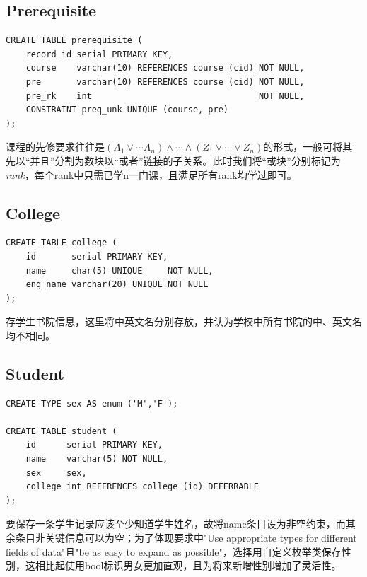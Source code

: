 \subsection{Prerequisite}
\begin{lstlisting}
CREATE TABLE prerequisite (
    record_id serial PRIMARY KEY,
    course    varchar(10) REFERENCES course (cid) NOT NULL,
    pre       varchar(10) REFERENCES course (cid) NOT NULL,
    pre_rk    int                                 NOT NULL,
    CONSTRAINT preq_unk UNIQUE (course, pre)
);
\end{lstlisting}
\vspace{-3em}\par
课程的先修要求往往是$(A_1\lor \cdots A_n)\land \cdots \land (Z_1\lor\cdots\lor Z_n)$的形式，一般可将其先以“并且”分割为数块以“或者”链接的子关系。此时我们将“或块”分别标记为\emph{rank}，每个rank中只需已学n一门课，且满足所有rank均学过即可。

\subsection{College}
\begin{lstlisting}
CREATE TABLE college (
    id       serial PRIMARY KEY,
    name     char(5) UNIQUE     NOT NULL,
    eng_name varchar(20) UNIQUE NOT NULL
);
\end{lstlisting}
\vspace{-3em}\par
存学生书院信息，这里将中英文名分别存放，并认为学校中所有书院的中、英文名均不相同。

\subsection{Student}
\begin{lstlisting}
CREATE TYPE sex AS enum ('M','F');

CREATE TABLE student (
    id      serial PRIMARY KEY,
    name    varchar(5) NOT NULL,
    sex     sex,
    college int REFERENCES college (id) DEFERRABLE
);
\end{lstlisting}
\vspace{-3em}\par
要保存一条学生记录应该至少知道学生姓名，故将name条目设为非空约束，而其余条目非关键信息可以为空；为了体现要求中"Use appropriate types for different fields of data"且"be as easy to expand as possible"，选择用自定义枚举类保存性别，这相比起使用bool标识男女更加直观，且为将来新增性别增加了灵活性。

